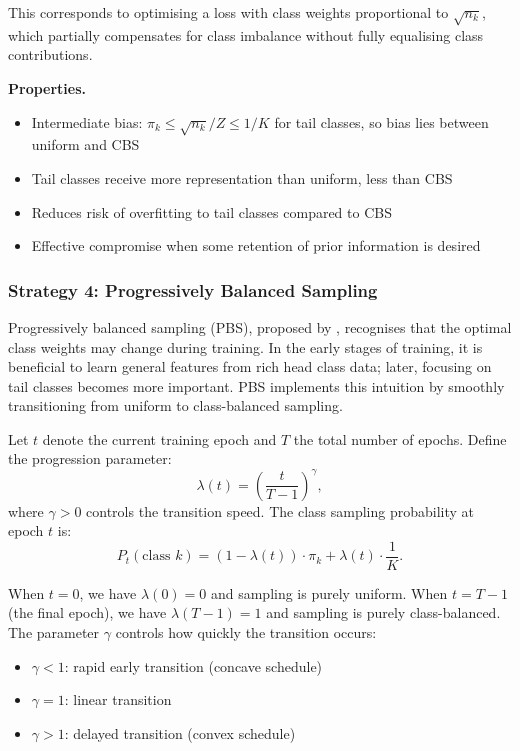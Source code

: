 \documentclass[12pt,a4paper]{article}
\begin{document}
This corresponds to optimising a loss with class weights proportional to $\sqrt{n_k}$, which partially compensates for class imbalance without fully equalising class contributions.

\textbf{Properties.}
\begin{itemize}[leftmargin=*]
    \item Intermediate bias: $\pi_k \leq \sqrt{n_k}/Z \leq 1/K$ for tail classes, so bias lies between uniform and CBS
    \item Tail classes receive more representation than uniform, less than CBS
    \item Reduces risk of overfitting to tail classes compared to CBS
    \item Effective compromise when some retention of prior information is desired
\end{itemize}

\subsubsection{Strategy 4: Progressively Balanced Sampling}
\label{subsec:progressive_sampling}
Progressively balanced sampling (PBS), proposed by \citet{kang2020decoupling}, recognises that the optimal class weights may change during training. In the early stages of training, it is beneficial to learn general features from rich head class data; later, focusing on tail classes becomes more important. PBS implements this intuition by smoothly transitioning from uniform to class-balanced sampling.

Let $t$ denote the current training epoch and $T$ the total number of epochs. Define the progression parameter:
\begin{equation}
    \lambda(t) = \left(\frac{t}{T-1}\right)^{\gamma},
    \label{eq:progression}
\end{equation}
where $\gamma > 0$ controls the transition speed. The class sampling probability at epoch $t$ is:
\begin{equation}
    P_t(\text{class } k) = (1 - \lambda(t)) \cdot \pi_k + \lambda(t) \cdot \frac{1}{K}.
    \label{eq:pbs_class_prob}
\end{equation}

When $t = 0$, we have $\lambda(0) = 0$ and sampling is purely uniform. When $t = T-1$ (the final epoch), we have $\lambda(T-1) = 1$ and sampling is purely class-balanced. The parameter $\gamma$ controls how quickly the transition occurs:
\begin{itemize}[leftmargin=*]
    \item $\gamma < 1$: rapid early transition (concave schedule)
    \item $\gamma = 1$: linear transition
    \item $\gamma > 1$: delayed transition (convex schedule)
\end{itemize}
\end{document}
